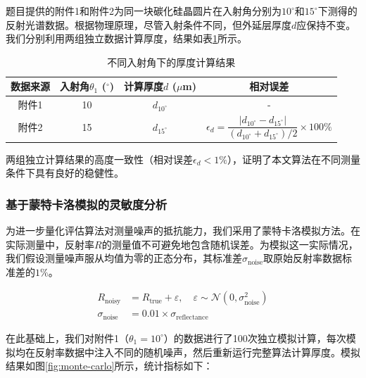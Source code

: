 \documentclass{ctexart} %
\begin{document}
题目提供的附件1和附件2为同一块碳化硅晶圆片在入射角分别为$10^\circ$和$15^\circ$下测得的反射光谱数据。根据物理原理，尽管入射条件不同，但外延层厚度$d$应保持不变。我们分别利用两组独立数据计算厚度，结果如表\ref{tab:cross-validation}所示。

\begin{table}[htbp]
    \centering
    \caption{不同入射角下的厚度计算结果}
    \label{tab:cross-validation}
    \begin{tabular}{cccc}
        \toprule
        数据来源 & 入射角$\theta_1$ ($^\circ$) & 计算厚度$d$ ($\mu$m) & 相对误差                                                                                               \\
        \midrule
        附件1  & 10                       & $d_{10^\circ}$   & -                                                                                                  \\
        附件2  & 15                       & $d_{15^\circ}$   & $\epsilon_d = \dfrac{|d_{10^\circ} - d_{15^\circ}|}{(d_{10^\circ} + d_{15^\circ})/2} \times 100\%$ \\
        \bottomrule
    \end{tabular}
\end{table}

两组独立计算结果的高度一致性（相对误差$\epsilon_d < 1\%$），证明了本文算法在不同测量条件下具有良好的稳健性。

\subsubsection{基于蒙特卡洛模拟的灵敏度分析}

为进一步量化评估算法对测量噪声的抵抗能力，我们采用了蒙特卡洛模拟方法。在实际测量中，反射率$R$的测量值不可避免地包含随机误差。为模拟这一实际情况，我们假设测量噪声服从均值为零的正态分布，其标准差$\sigma_{\text{noise}}$取原始反射率数据标准差的$1\%$。

\begin{align}
    R_{\text{noisy}}      & = R_{\text{true}} + \varepsilon, \quad \varepsilon \sim \mathcal{N}(0, \sigma_{\text{noise}}^2) \\
    \sigma_{\text{noise}} & = 0.01 \times \sigma_{\text{reflectance}}
\end{align}

在此基础上，我们对附件1（$\theta_1 = 10^\circ$）的数据进行了100次独立模拟计算，每次模拟均在反射率数据中注入不同的随机噪声，然后重新运行完整算法计算厚度。模拟结果如图\ref{fig:monte-carlo}所示，统计指标如下：
\end{document}
